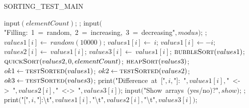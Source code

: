\documentclass[a4paper,10pt]{article}
\begin{document}
\begin{algorithm}
\caption{SORTING\_TEST\_MAIN}
\begin{algorithmic}[5]
\State {}
\State {}
\State {}
\State {}
  \Repeat
    \State \(\)input\((elementCount)\);
  ;
  \Repeat
    \State \(\)input\((\)"{}Filling:\ 1\ =\ random,\ 2\ =\ increasing,\ 3\ =\ decreasing"{}\(,modus)\);
  ;
        \State \(values1[i]\gets\ random(10000)\);
      \EndSelector
        \State \(values1[i]\gets\ i\);
      \EndSelector
        \State \(values1[i]\gets-i\);
      \EndSelector
    \EndCase
  \EndFor
    \State \(values2[i]\gets\ values1[i]\);
    \State \(values3[i]\gets\ values1[i]\);
  \EndFor
  \Para
      \State \(\Call{bubbleSort}{values1}\);
      \State \(\Call{quickSort}{values2,0,elementCount}\);
      \State \(\Call{heapSort}{values3}\);
  \EndPara
  \State \(ok1\gets\Call{testSorted}{values1}\);
  \State \(ok2\gets\Call{testSorted}{values2}\);
  \State \(ok3\gets\Call{testSorted}{values3}\);
        \State \(\)print\((\)"{}Difference\ at\ ["{}\(,i,\)"{}]:\ "{}\(,values1[i],\)"{}\ \textless-\textgreater\ "{}\(,values2[i],\)"{}\ \textless-\textgreater\ "{}\(,values3[i])\);
      \EndIf
    \EndFor
  \EndIf
  \Repeat
    \State \(\)input\((\)"{}Show\ arrays\ (yes/no)?"{}\(,show)\);
  ;
      \State \(\)print\((\)"{}["{}\(,i,\)"{}]:\textbackslash{}t"{}\(,values1[i],\)"{}\textbackslash{}t"{}\(,values2[i],\)"{}\textbackslash{}t"{}\(,values3[i])\);
    \EndFor
  \EndIf
\EndProcedure
\end{algorithmic}
\end{algorithm}
\end{document}
